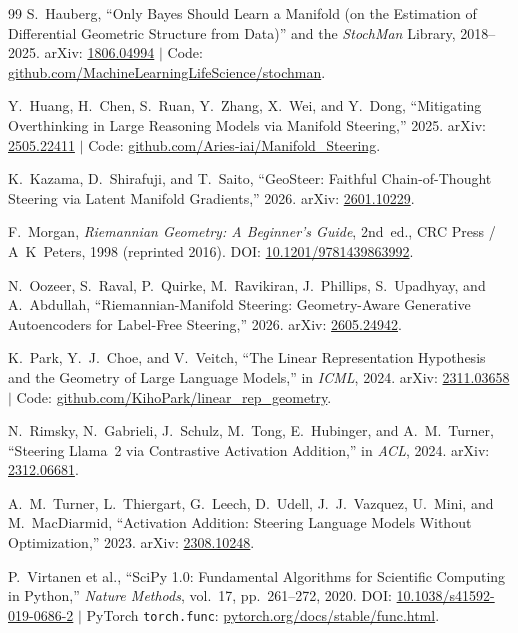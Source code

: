 \documentclass[11pt,a4paper]{article}
\theoremstyle{definition}
\begin{document}
\begin{thebibliography}{99}
S.~Hauberg,
``Only Bayes Should Learn a Manifold (on the Estimation of Differential Geometric Structure from Data)'' and the \emph{StochMan} Library, 2018--2025.
arXiv: \href{https://arxiv.org/abs/1806.04994}{1806.04994} $\mid$
Code: \href{https://github.com/MachineLearningLifeScience/stochman}{github.com/MachineLearningLifeScience/stochman}.

Y.~Huang, H.~Chen, S.~Ruan, Y.~Zhang, X.~Wei, and Y.~Dong,
``Mitigating Overthinking in Large Reasoning Models via Manifold Steering,'' 2025.
arXiv: \href{https://arxiv.org/abs/2505.22411}{2505.22411} $\mid$
Code: \href{https://github.com/Aries-iai/Manifold_Steering}{github.com/Aries-iai/Manifold\_Steering}.

K.~Kazama, D.~Shirafuji, and T.~Saito,
``GeoSteer: Faithful Chain-of-Thought Steering via Latent Manifold Gradients,'' 2026.
arXiv: \href{https://arxiv.org/abs/2601.10229}{2601.10229}.

F.~Morgan,
\emph{Riemannian Geometry: A Beginner's Guide}, 2nd~ed.,
CRC Press / A~K~Peters, 1998 (reprinted 2016).
DOI: \href{https://doi.org/10.1201/9781439863992}{10.1201/9781439863992}.

N.~Oozeer, S.~Raval, P.~Quirke, M.~Ravikiran, J.~Phillips, S.~Upadhyay, and A.~Abdullah,
``Riemannian-Manifold Steering: Geometry-Aware Generative Autoencoders for Label-Free Steering,'' 2026.
arXiv: \href{https://arxiv.org/abs/2605.24942}{2605.24942}.

K.~Park, Y.~J.~Choe, and V.~Veitch,
``The Linear Representation Hypothesis and the Geometry of Large Language Models,''
in \emph{ICML}, 2024.
arXiv: \href{https://arxiv.org/abs/2311.03658}{2311.03658} $\mid$
Code: \href{https://github.com/KihoPark/linear_rep_geometry}{github.com/KihoPark/linear\_rep\_geometry}.

N.~Rimsky, N.~Gabrieli, J.~Schulz, M.~Tong, E.~Hubinger, and A.~M.~Turner,
``Steering Llama~2 via Contrastive Activation Addition,''
in \emph{ACL}, 2024.
arXiv: \href{https://arxiv.org/abs/2312.06681}{2312.06681}.

A.~M.~Turner, L.~Thiergart, G.~Leech, D.~Udell, J.~J.~Vazquez, U.~Mini, and M.~MacDiarmid,
``Activation Addition: Steering Language Models Without Optimization,'' 2023.
arXiv: \href{https://arxiv.org/abs/2308.10248}{2308.10248}.

P.~Virtanen et al.,
``SciPy 1.0: Fundamental Algorithms for Scientific Computing in Python,''
\emph{Nature Methods}, vol.~17, pp.~261--272, 2020.
DOI: \href{https://doi.org/10.1038/s41592-019-0686-2}{10.1038/s41592-019-0686-2} $\mid$
PyTorch \texttt{torch.func}: \href{https://pytorch.org/docs/stable/func.html}{pytorch.org/docs/stable/func.html}.


\end{thebibliography}
\end{document}
